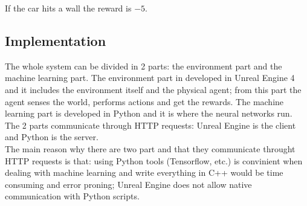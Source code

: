 \documentclass[14pt]{extarticle}
\def\sp{\vspace{5pt}}
\begin{document}
\begin{flushleft}
	If the car hits a wall the reward is $-5$.
	
\subsection{Implementation}
\sp
The whole system can be divided in 2 parts: the environment part and the machine learning part. The environment part in developed in Unreal Engine 4 and it includes the environment itself and the physical agent; from this part the agent senses the world, performs actions and get the rewards. The machine learning part is developed in Python and it is where the neural networks run.
\\
The 2 parts communicate through HTTP requests: Unreal Engine is the client and Python is the server. 
\\
The main reason why there are two part and that they communicate throught HTTP requests is that: using Python tools (Tensorflow, etc.) is convinient when dealing with machine learning and write everything in C++ would be time consuming and error proning; Unreal Engine does not allow native communication with Python scripts.

\end{flushleft}
\end{document}
